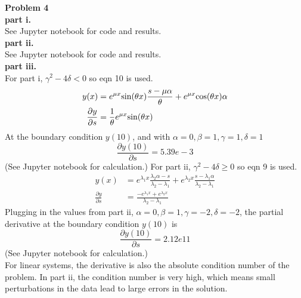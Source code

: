 \documentclass{article} %
\begin{document}
\textbf{Problem 4} \\
\textbf{part i.} \\
See Jupyter notebook for code and results. \\

\textbf{part ii.} \\
See Jupyter notebook for code and results. \\

\textbf{part iii.} \\
For part i, $\gamma^2-4\delta < 0$ so eqn 10 is used.
\begin{align*}
y(x) &= e^{\mu x}\hbox{sin}(\theta x)\frac{s-\mu \alpha}{\theta} + e^{\mu x} \hbox{cos}(\theta x) \alpha \\
\frac{\partial y}{\partial s} &= \frac{1}{\theta}e^{\mu x}\hbox{sin}(\theta x) 
\end{align*}
At the boundary condition $y(10)$, and with $\alpha = 0, \beta = 1, \gamma = 1, \delta = 1$
\begin{equation*}
\frac{\partial y(10)}{\partial s} = 5.39e-3
\end{equation*}
(See Jupyter notebook for calculation.)
For part ii, $\gamma^2-4\delta \geq 0$ so eqn 9 is used.
\begin{align*}
y(x) &= e^{\lambda_1 x} \frac{\lambda_2 \alpha - s}{\lambda_2 - \lambda_1} + e^{\lambda_2 x} \frac{s - \lambda_1 \alpha}{\lambda_2 - \lambda_1} \\
\frac{\partial y}{\partial s} &= \frac{-e^{\lambda_1 x} + e^{\lambda_2 x}}{\lambda_2 - \lambda_1} 
\end{align*}
Plugging in the values from part ii, $\alpha = 0, \beta = 1, \gamma = -2, \delta = -2$, the partial derivative at the boundary condition $y(10)$ is
\begin{equation*}
\frac{\partial y(10)}{\partial s} = 2.12e11
\end{equation*}
(See Jupyter notebook for calculation.) \\
For linear systems, the derivative is also the absolute condition number of the problem.  In part ii, the condition number is very high, which means small perturbations in the data lead to large errors in the solution.
\\
\end{document}
